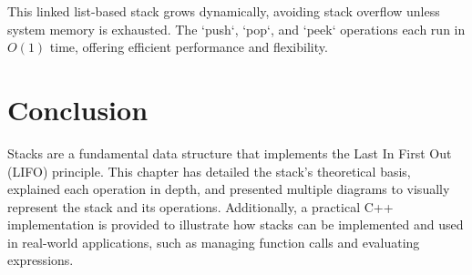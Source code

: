 This linked list-based stack grows dynamically, avoiding stack overflow unless system memory is exhausted. The `push`, `pop`, and `peek` operations each run in \( O(1) \) time, offering efficient performance and flexibility.


\section{Conclusion}
Stacks are a fundamental data structure that implements the Last In First Out (LIFO) principle. This chapter has detailed the stack's theoretical basis, explained each operation in depth, and presented multiple diagrams to visually represent the stack and its operations. Additionally, a practical C++ implementation is provided to illustrate how stacks can be implemented and used in real-world applications, such as managing function calls and evaluating expressions.
